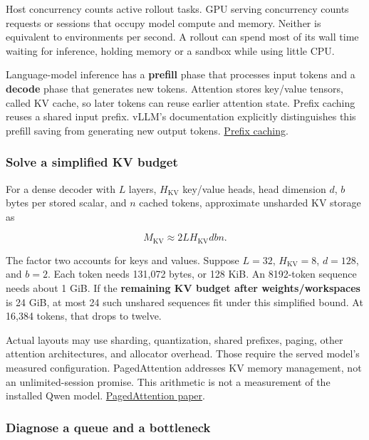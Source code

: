 \documentclass[
  11pt,
  letterpaper,
]{article}
\begin{document}
Host concurrency counts active rollout tasks. GPU serving concurrency
counts requests or sessions that occupy model compute and memory.
Neither is equivalent to environments per second. A rollout can spend
most of its wall time waiting for inference, holding memory or a sandbox
while using little CPU.

Language-model inference has a \textbf{prefill} phase that processes
input tokens and a \textbf{decode} phase that generates new tokens.
Attention stores key/value tensors, called KV cache, so later tokens can
reuse earlier attention state. Prefix caching reuses a shared input
prefix. vLLM's documentation explicitly distinguishes this prefill
saving from generating new output tokens.
\href{https://docs.vllm.ai/en/latest/features/automatic_prefix_caching/}{Prefix
caching}.

\subsubsection{Solve a simplified KV
budget}\label{solve-a-simplified-kv-budget}

For a dense decoder with \(L\) layers, \(H_{\mathrm{KV}}\) key/value
heads, head dimension \(d\), \(b\) bytes per stored scalar, and \(n\)
cached tokens, approximate unsharded KV storage as

\[M_{\mathrm{KV}}\approx2L H_{\mathrm{KV}}d b n.\]

The factor two accounts for keys and values. Suppose \(L=32\),
\(H_{\mathrm{KV}}=8\), \(d=128\), and \(b=2\). Each token needs 131,072
bytes, or 128 KiB. An 8192-token sequence needs about 1 GiB. If the
\textbf{remaining KV budget after weights/workspaces} is 24 GiB, at most
24 such unshared sequences fit under this simplified bound. At 16,384
tokens, that drops to twelve.

Actual layouts may use sharding, quantization, shared prefixes, paging,
other attention architectures, and allocator overhead. Those require the
served model's measured configuration. PagedAttention addresses KV
memory management, not an unlimited-session promise. This arithmetic is
not a measurement of the installed Qwen model.
\href{https://arxiv.org/abs/2309.06180}{PagedAttention paper}.

\subsubsection{Diagnose a queue and a
bottleneck}\label{diagnose-a-queue-and-a-bottleneck}
\end{document}
